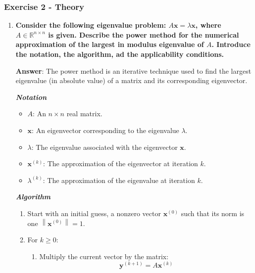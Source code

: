 \newpage

\subsubsection*{Exercise 2 - Theory}

\begin{enumerate}[label=\textcolor{Green3}{\textbf{\arabic*.}}]
    \item \textcolor{Green3}{\textbf{%
        Consider the following eigenvalue problem: $A\mathbf{x} = \lambda\mathbf{x}$, where $A \in \mathbb{R}^{n \times n}$ is given. Describe the power method for the numerical approximation of the largest in modulus eigenvalue of $A$. Introduce the notation, the algorithm, ad the applicability conditions.
    }}

    \textbf{Answer}: The power method is an iterative technique used to find the largest eigenvalue (in absolute value) of a matrix and its corresponding eigenvector.

    \textbf{\emph{Notation}}
    \begin{itemize}
        \item $A$: An $n \times n$ real matrix.
        \item $\mathbf{x}$: An eigenvector corresponding to the eigenvalue $\lambda$.
        \item $\lambda$: The eigenvalue associated with the eigenvector $\mathbf{x}$.
        \item $\mathbf{x}^{(k)}$: The approximation of the eigenvector at iteration $k$.
        \item $\lambda^{(k)}$: The approximation of the eigenvalue at iteration $k$.
    \end{itemize}
    
    \textbf{\emph{Algorithm}}
    \begin{enumerate}
        \item Start with an initial guess, a nonzero vector $\mathbf{x}^{\left(0\right)}$ such that its norm is one $\left\| \mathbf{x}^{\left(0\right)} \right\| = 1$.
        
        \item For $k \ge 0$:
        \begin{enumerate}
            \item Multiply the current vector by the matrix:
            \begin{equation*}
                \mathbf{y}^{\left(k+1\right)} = A\mathbf{x}^{\left(k\right)}
            \end{equation*}


\end{enumerate}
\end{enumerate}
\end{enumerate}
